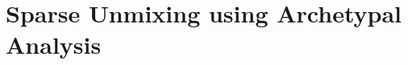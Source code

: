 
\lhead[\fancyplain{}{\leftmark}]%
      {\fancyplain{}{}} %
\chead[\fancyplain{}{}]%
      {\fancyplain{}{}}
\rhead[\fancyplain{}{}]%
      {\fancyplain{}{\rightmark}}%
\lfoot[\fancyplain{}{}]%
      {\fancyplain{}{}}
\cfoot[\fancyplain{}{\thepage}]%
      {\fancyplain{}{\thepage}} %
\rfoot[\fancyplain{}{}]%
     {\fancyplain{}{\scriptsize}}




\chapter{Sparse Unmixing using Archetypal Analysis}
\label{ch:SUnAA}


